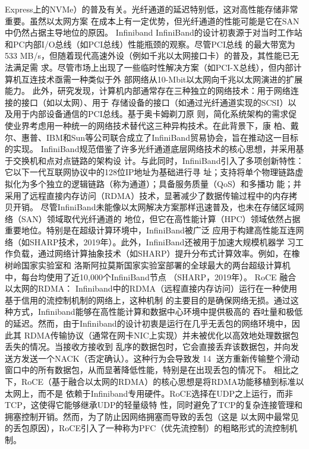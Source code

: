 Express上的NVMe）的普及有关。光纤通道的延迟特别低，这对高性能存储非常重要。虽然以太网方案
在成本上有一定优势，但光纤通道的性能可能是它在SAN中仍然占据主导地位的原因。
Infiniband
InfiniBand的设计初衷源于对当时工作站和PC内部I/O总线（如PCI总线）性能瓶颈的观察。尽管PCI总线
的最大带宽为533 MB/s，但随着现代高速外设（例如千兆以太网接口卡）的普及，其性能已无法满足需
求。尽管市场上出现了一些临时性解决方案（如PCI-X总线），但内部计算机互连技术亟需一种类似于外
部网络从10-Mbit以太网向千兆以太网演进的扩展能力。
此外，研究发现，计算机内部通常存在三种独立的网络技术：用于网络连接的接口（如以太网）、用于
存储设备的接口（如通过光纤通道实现的SCSI）以及用于内部设备通信的PCI总线。基于奥卡姆剃刀原
则，简化系统架构的需求促使业界考虑用一种统一的网络技术替代这三种异构技术。在此背景下，康
柏、戴尔、惠普、IBM和Sun等公司联合成立了InfiniBand贸易协会，旨在推动这一目标的实现。
InfiniBand规范借鉴了许多光纤通道底层网络技术的核心思想，并采用基于交换机和点对点链路的架构设
计。与此同时，InfiniBand引入了多项创新特性：它以下一代互联网协议中的128位IP地址为基础进行寻
址；支持将单个物理链路虚拟化为多个独立的逻辑链路（称为通道）；具备服务质量（QoS）和多播功
能；并采用了远程直接内存访问（RDMA）技术，显著减少了数据传输过程中的内存拷贝开销。
尽管InfiniBand未能像以太网解决方案那样迅速普及，也未在存储区域网络（SAN）领域取代光纤通道的
地位，但它在高性能计算（HPC）领域依然占据重要地位。特别是在超级计算环境中，InfiniBand被广泛
应用于构建高性能互连网络（如SHARP技术，2019年）。此外，InfiniBand还被用于加速大规模机器学
习工作负载，通过网络计算抽象技术（如SHARP）提升分布式计算效率。例如，在橡树岭国家实验室和
洛斯阿拉莫斯国家实验室部署的全球最大的两台超级计算机中，每台均使用了近10,000个InfiniBand节点
（SHARP，2019年）。
RoCE 融合以太网的RDMA：
Infiniband中的RDMA（远程直接内存访问）运行在一种使用基于信用的流控制机制的网络上，这种机制
的主要目的是确保网络无损。通过这种方式，Infiniband能够在高性能计算和数据中心环境中提供极高的
吞吐量和极低的延迟。然而，由于Infiniband的设计初衷是运行在几乎无丢包的网络环境中，因此其
RDMA传输协议（通常在网卡NIC上实现）并未被优化以高效地处理数据包丢失的情况。当接收方接收到
乱序的数据包时，它会直接丢弃该数据包，并向发送方发送一个NACK（否定确认）。这种行为会导致发
                                                        14
送方重新传输整个滑动窗口中的所有数据包，从而显著降低性能，特别是在出现丢包的情况下。
相比之下，RoCE（基于融合以太网的RDMA）的核心思想是将RDMA功能移植到标准以太网上，而不是
依赖于Infiniband专用硬件。RoCE选择在UDP之上运行，而非TCP，这使得它能够继承UDP的轻量级特
性，同时避免了TCP的复杂连接管理和拥塞控制开销。然而，为了防止因网络拥塞而导致的丢包（这是
以太网中最常见的丢包原因），RoCE引入了一种称为PFC（优先流控制）的粗略形式的流控制机制。
